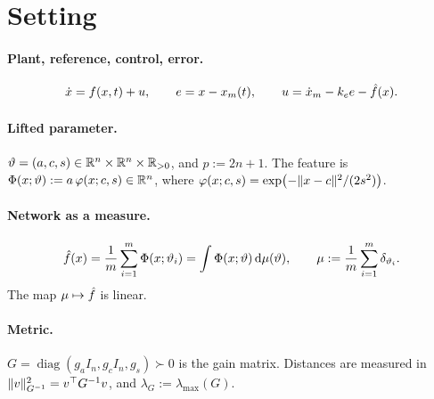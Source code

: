 \section{Setting}\label{sec:setting}

\paragraph{Plant, reference, control, error.}
\[
  \dot x = f(x,t) + u,\qquad e = x - x_m(t),\qquad u = \dot x_m - k_e e - \hat f(x).
\]

\paragraph{Lifted parameter.}
$\vartheta = (a,c,s)\in\mathbb{R}^n\times\mathbb{R}^n\times\mathbb{R}_{>0}$, and $p := 2n+1$. The feature is
${\Phi(x;\vartheta) := a\,\varphi(x;c,s)}\in\mathbb{R}^n$, where $\varphi(x;c,s) = \exp\bigl(-\lVert x-c\rVert^2/(2s^2)\bigr)$.

\paragraph{Network as a measure.}
\[
  \hat f(x) = \frac1m\sum_{i=1}^m \Phi(x;\vartheta_i) = \int\Phi(x;\vartheta)\,\mathrm{d}\mu(\vartheta),
  \qquad \mu := \frac1m\sum_{i=1}^m\delta_{\vartheta_i}.
\]
The map $\mu\mapsto\hat f$ is linear.

\paragraph{Metric.}
$G = \operatorname{diag}(g_a I_n, g_c I_n, g_s)\succ 0$ is the gain matrix. Distances are measured in
$\lVert v\rVert_{G^{-1}}^2 = v^\top G^{-1} v$, and $\lambda_G := \lambda_{\max}(G)$.

